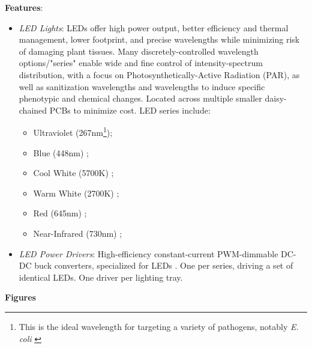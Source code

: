 \textbf{Features}:
\begin{itemize}
    \item \textit{LED Lights}: LEDs offer high power output, better efficiency and thermal management, lower footprint, and precise wavelengths while minimizing risk of damaging plant tissues. Many discretely-controlled wavelength options/"series" enable wide and fine control of intensity-spectrum distribution, with a focus on Photosynthetically-Active Radiation (PAR), as well as sanitization wavelengths and wavelengths to induce specific phenotypic and chemical changes. Located across multiple smaller daisy-chained PCBs to minimize cost. LED series include:
    \begin{itemize}
        \item Ultraviolet (267nm\footnote{This is the ideal wavelength for targeting a variety of pathogens, notably \textit{E. coli} \cite{uvecoli}}); %
        \item Blue (448nm) \cite{led_xpg3};
        \item Cool White (5700K) \cite{led_xpg3};
        \item Warm White (2700K) \cite{led_xpg3};
        \item Red (645nm) \cite{led_xpg3};
        \item Near-Infrared (730nm) \cite{led_xpe2};
    \end{itemize}
    \item \textit{LED Power Drivers}: High-efficiency constant-current PWM-dimmable DC-DC buck converters, specialized for LEDs \cite{leddriver}. One per series, driving a set of identical LEDs. One driver per lighting tray.
\end{itemize}

\clearpage

\textbf{Figures}

